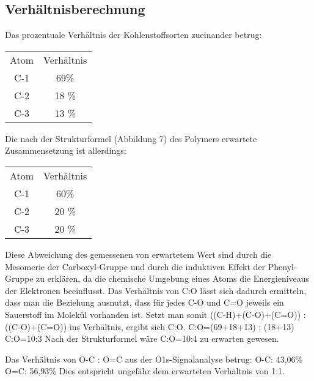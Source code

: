 \documentclass{article}
\begin{document}
\subsection{Verhältnisberechnung}

Das prozentuale Verhältnis der Kohlenstoffsorten zueinander betrug:

\begin{table}[htpb]
  \begin{tabular}{cc}
      Atom & Verhältnis\\
  C-1  & 69\% \\
  C-2  & 18 \% \\
  C-3  & 13 \% \\
  \end{tabular}
\end{table}

Die nach der Strukturformel (Abbildung 7) des Polymers erwartete Zusammensetzung ist allerdings:
\begin{table}[htpb]
  \begin{tabular}{cc}
      Atom & Verhältnis\\
    C-1  & 60\% \\
    C-2  & 20 \% \\
    C-3  & 20 \% \\
  \end{tabular}
\end{table}
Diese Abweichung des gemessenen von erwartetem Wert sind durch  
die Mesomerie der Carboxyl-Gruppe und durch die induktiven Effekt der
Phenyl-Gruppe zu erklären, da die chemische Umgebung eines Atoms die
Energieniveaus der Elektronen beeinflusst. 
Das Verhältnis von C:O lässt sich dadurch ermitteln, dass man die Beziehung
ausnutzt, dass für jedes C-O und C=O jeweils ein Sauerstoff im Molekül vorhanden
ist. Setzt man somit ((C-H)+(C-O)+(C=O)) : ((C-O)+(C=O)) ins Verhältnis, ergibt
sich C:O. 
C:O=(69+18+13) : (18+13) C:O=10:3 Nach der Strukturformel wäre
C:O=10:4 zu erwarten gewesen.

Das Verhältnis von O-C : O=C aus der O1s-Signalanalyse betrug: O-C:	43,06\%	O=C:
56,93\% Dies entspricht ungefähr dem erwarteten Verhältnis von 1:1. 

\printbibliography
\end{document}
